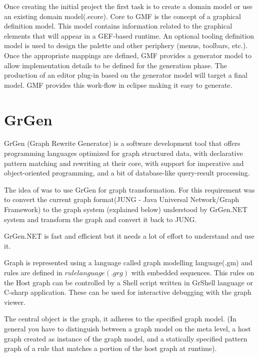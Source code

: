Once creating the initial project the first task is to create a domain model or use an existing domain model(.ecore). Core to GMF is the concept of a graphical definition model. This model contains information related to the graphical elements that will appear in a GEF-based runtime. An optional tooling definition model is used to design the palette and other periphery (menus, toolbars, etc.). Once the appropriate mappings are defined, GMF provides a generator model to allow implementation details to be defined for the generation phase. The production of an editor plug-in based on the generator model will target a final model. GMF provides this work-flow in eclipse making it easy to generate. 


\section{GrGen}
GrGen (Graph Rewrite Generator) is a software development tool that offers programming
languages optimized for graph structured data, with declarative pattern matching and rewriting at their core, with support for imperative and object-oriented programming, and a bit of database-like query-result processing\cite{grgen}. 

The idea of was to use GrGen for graph transformation. For this requirement was to convert the current graph format(JUNG - Java Universal Network/Graph Framework) to the graph system (explained below) understood by GrGen.NET system and transform the graph and convert it back to JUNG. 

GrGen.NET is fast and efficient but it needs a lot of effort to understand and use it.

Graph is represented using a language called graph modelling language(.gm) and rules are defined in $rule language (.grg)$  with embedded sequences. This rules on the Host graph can be controlled by a Shell script written in GrShell language or  C-sharp application. These can be used for interactive debugging with the graph viewer. 

The central object is the graph, it adheres to the specified graph model. (In general
you have to distinguish between a graph model on the meta level, a host graph created as instance of the graph model, and a statically specified pattern graph of a rule that matches a portion of the host graph at runtime).\\

